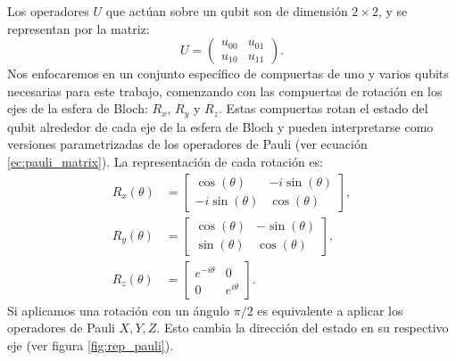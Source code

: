 \documentclass[letterpaper,12pt]{thesisECFM}
\theoremstyle{plain}
\theoremstyle{definition}
\theoremstyle{definition}
\theoremstyle{remark}
\newcommand{\1}{\mathbb{1}}
\begin{document}
Los operadores $U$ que actúan sobre un qubit son de dimensión $2 \times 2$, y se representan por la matriz:
\begin{equation}
    U = \begin{pmatrix}
    u_{00} & u_{01}  \\
    u_{10} & u_{11} 
    \end{pmatrix}.
\end{equation}
Nos enfocaremos en un conjunto específico de compuertas de uno y varios qubits
necesarias para este trabajo, comenzando con las compuertas de rotación en los
ejes de la esfera de Bloch: $R_x$, $R_y$ y $R_z$. Estas compuertas rotan el
estado del qubit alrededor de cada eje de la esfera de Bloch y pueden
interpretarse como versiones parametrizadas de los operadores de Pauli (ver
ecuación \ref{ec:pauli_matrix}). La representación de cada rotación es:
\begin{align}
    R_x(\theta) &=  \begin{bmatrix}
    \cos{(\theta)} & -i\sin{(\theta)}\\
    -i\sin{(\theta)} & \cos{(\theta)} 
    \end{bmatrix},  \\
    R_y(\theta) &=  \begin{bmatrix}
    \cos{(\theta)} & -\sin{(\theta)}\\
    \sin{(\theta)} & \cos{(\theta)} 
    \end{bmatrix}, \\
    R_z(\theta) &=  \begin{bmatrix}
    e^{-i\theta} & 0\\
    0 & e^{i\theta} 
    \end{bmatrix}.
\end{align}
Si aplicamos una rotación con un ángulo $\pi/2$ es equivalente a aplicar los
operadores de Pauli $X,Y,Z$. Esto cambia la dirección del estado en su
respectivo eje (ver figura \ref{fig:rep_pauli}). 
\end{document}
